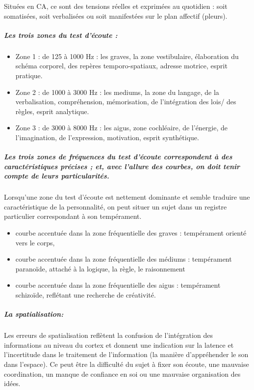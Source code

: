 Situées en CA, ce sont des tensions réelles et exprimées au quotidien
: soit somatisées, soit verbalisées ou soit manifestées sur le plan
affectif (pleurs).

\subparagraph{Les trois zones du test d'écoute : }
\begin{itemize}
\item Zone 1 : de 125 à 1000 Hz : les graves, la zone vestibulaire, élaboration
du schéma corporel, des repères temporo-spatiaux, adresse motrice,
esprit pratique.
\item Zone 2 : de 1000 à 3000 Hz : les mediums, la zone du langage, de la
verbalisation, compréhension, mémorisation, de l'intégration des lois/
des règles, esprit analytique.
\item Zone 3 : de 3000 à 8000 Hz : les aigus, zone cochléaire, de l'énergie,
de l'imagination, de l'expression, motivation, esprit synthétique.
\end{itemize}

\subparagraph{Les trois zones de fréquences du test d'écoute correspondent à des
caractéristiques précises ; et, avec l'allure des courbes, on doit
tenir compte de leurs particularités.}

Lorsqu'une zone du test d'écoute est nettement dominante et semble
traduire une caractéristique de la personnalité, on peut situer un
sujet dans un registre particulier correspondant à son tempérament.

\begin{itemize}
	\item courbe accentuée dans la zone fréquentielle des graves : tempérament
	orienté vers le corps,
	
	\item courbe accentuée dans la zone fréquentielle des médiums : tempérament
	paranoïde, attaché à la logique, la règle, le raisonnement 
	
	\item courbe accentuée dans la zone fréquentielle des aigus : tempérament
	schizoïde, reflétant une recherche de créativité. 
\end{itemize}



\subparagraph{La spatialisation: }


Les erreurs de spatialisation reflètent la confusion
de l'intégration des informations au niveau du cortex et donnent une indication sur la latence et l'incertitude
dans le traitement de l'information (la manière d'appréhender le
son dans l'espace). Ce peut être la difficulté du sujet à fixer son
écoute, une mauvaise coordination, un manque de confiance en soi ou
une mauvaise organisation des idées.

